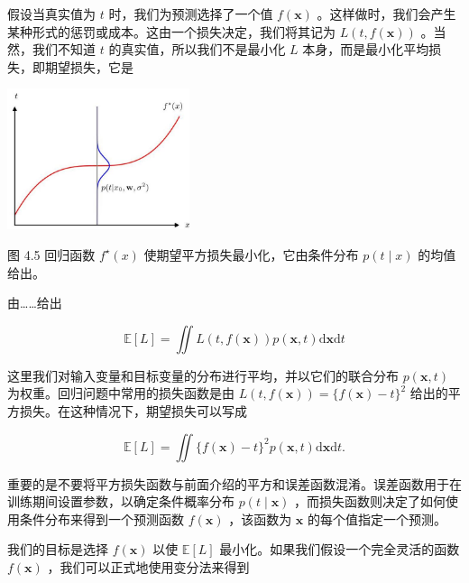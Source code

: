 \documentclass[10pt]{article}
\begin{document}
假设当真实值为 \(t\) 时，我们为预测选择了一个值 \(f\left( \mathbf{x}\right)\) 。这样做时，我们会产生某种形式的惩罚或成本。这由一个损失决定，我们将其记为 \(L\left( {t,f\left( \mathbf{x}\right) }\right)\) 。当然，我们不知道 \(t\) 的真实值，所以我们不是最小化 \(L\) 本身，而是最小化平均损失，即期望损失，它是

\begin{center}
\includegraphics[max width=0.4\textwidth]{images/0194e279-9b28-703a-88f4-c3ac21e2010d_140_931_345_610_472_0.jpg}
\end{center}
\hspace*{3em} 

图 4.5 回归函数 \({f}^{ \star  }\left( x\right)\) 使期望平方损失最小化，它由条件分布 \(p\left( {t \mid  x}\right)\) 的均值给出。

由……给出

\[
\mathbb{E}\left\lbrack  L\right\rbrack   = \iint L\left( {t,f\left( \mathbf{x}\right) }\right) p\left( {\mathbf{x},t}\right) \mathrm{d}\mathbf{x}\mathrm{d}t \tag{4.34}
\]

这里我们对输入变量和目标变量的分布进行平均，并以它们的联合分布 \(p\left( {\mathbf{x},t}\right)\) 为权重。回归问题中常用的损失函数是由 \(L\left( {t,f\left( \mathbf{x}\right) }\right)  = \{ f\left( \mathbf{x}\right)  - t{\} }^{2}\) 给出的平方损失。在这种情况下，期望损失可以写成

\[
\mathbb{E}\left\lbrack  L\right\rbrack   = \iint \{ f\left( \mathbf{x}\right)  - t{\} }^{2}p\left( {\mathbf{x},t}\right) \mathrm{d}\mathbf{x}\mathrm{d}t. \tag{4.35}
\]

重要的是不要将平方损失函数与前面介绍的平方和误差函数混淆。误差函数用于在训练期间设置参数，以确定条件概率分布 \(p\left( {t \mid  \mathbf{x}}\right)\) ，而损失函数则决定了如何使用条件分布来得到一个预测函数 \(f\left( \mathbf{x}\right)\) ，该函数为 \(\mathbf{x}\) 的每个值指定一个预测。

我们的目标是选择 \(f\left( \mathbf{x}\right)\) 以使 \(\mathbb{E}\left\lbrack  L\right\rbrack\) 最小化。如果我们假设一个完全灵活的函数 \(f\left( \mathbf{x}\right)\) ，我们可以正式地使用变分法来得到
\end{document}
